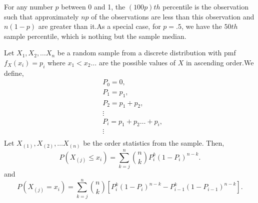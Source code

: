 \documentclass[a4paper,english,12pt]{article}
\begin{document}
\begin{defn}
For any number $p$ between 0 and 1, the $(100p)th$ percentile is the observation such that approximately $np$ of the observations are less than this observation and $n(1-p)$ are greater than it.As a special case, for $p=.5$, we have the $50th$ sample percentile, which is nothing but the sample median.
\end{defn}
\begin{thm} \label{theorem:thm_5.4.3_casella_berger}
Let $X_1,X_2, \dots X_n$ be a random sample from a discrete distribution with pmf $f_X(x_i)=p_i$ where $x_1<x_2 \ldots $ are the possible values of $X$ in ascending order.We define,
\begin{align}
& P_0=0, \nonumber \\
& P_1=p_1,\nonumber \\
& P_2=p_1+p_2, \\ \nonumber
& \vdots  \nonumber \\ \nonumber
& P_i=p_1+p_2\ldots +p_i, \\ \nonumber
& \vdots \\ \nonumber
\end{align}
Let $X_{(1)},X_{(2)},\dots X_{(n)}$ be the order statistics from the sample. Then,
\begin{equation} \label{eqn:casella berger pg 228 eq 5.4.2}
P(X_{(j)} \leq x_i)={\sum\limits_{k=j}^n} \binom{n}{k} P_i ^{k} (1-P_i)^{n-k}.
\end{equation}
and
\begin{equation} \label{eqn2:casella berger pg 228 eq 5.4.3}
P(X_{(j)} = x_i)={\sum\limits_{k=j}^n} \binom{n}{k} [P_i ^{k} (1-P_i)^{n-k} - P_{i-1} ^{k} (1-P_{i-1})^{n-k}].
\end{equation}
\end{thm}
\end{document}
